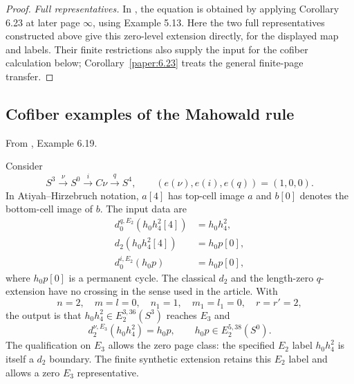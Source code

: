 \begin{proof}
\textit{Full representatives.}
In \cite[Example 6.24]{LWX126}, the equation is obtained by applying
Corollary 6.23 at later page $\infty$, using Example 5.13. Here the two
full representatives constructed above give this zero-level extension
directly, for the displayed map and labels. Their finite restrictions
also supply the input for the cofiber calculation below;
Corollary~\ref{paper:6.23} treats the general finite-page transfer.
\end{proof}

\subsection{Cofiber examples of the Mahowald rule}

\begin{proposition}
\label{paper:6.19}
\label{exam:Mahowald}
From \cite{LWX126}, Example 6.19.\par
Consider
\[
S^3\xrightarrow{\nu}S^0\xrightarrow{i}C\nu\xrightarrow{q}S^4,
\qquad (e(\nu),e(i),e(q))=(1,0,0).
\]
In Atiyah--Hirzebruch notation, $a[4]$ has top-cell image $a$ and $b[0]$ denotes the bottom-cell image of $b$. The input data are
\[
\begin{aligned}
d_0^{q,E_2}(h_0h_4^2[4])&=h_0h_4^2,\\
d_2(h_0h_4^2[4])&=h_0p[0],\\
d_0^{i,E_2}(h_0p)&=h_0p[0],
\end{aligned}
\]
where $h_0p[0]$ is a permanent cycle. The classical $d_2$ and the length-zero $q$-extension have no crossing in the sense used in the article. With
\[
n=2,\quad m=l=0,\quad n_1=1,\quad m_1=l_1=0,
\quad r=r'=2,
\]
the output is that $h_0h_4^2\in E_2^{3,36}(S^3)$ reaches $E_3$ and
\[
d_2^{\nu,E_3}(h_0h_4^2)=h_0p,
\qquad h_0p\in E_2^{5,38}(S^0).
\]
The qualification on $E_3$ allows the zero page class: the specified
$E_2$ label $h_0h_4^2$ is itself a $d_2$ boundary. The finite synthetic
extension retains this $E_2$ label and allows a zero $E_3$ representative.
\end{proposition}
